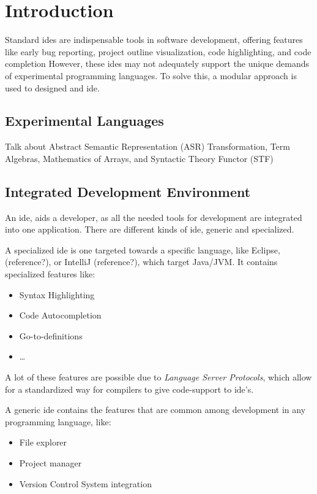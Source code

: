\chapter{Introduction}

Standard \gls{ide}s are indispensable tools in software development, offering features
like early bug reporting, project outline visualization, code highlighting, and
code completion However, these \gls{ide}s may not adequately support the unique
demands of experimental programming languages.
To solve this, a modular approach is used to designed and \gls{ide}.

\section{Experimental Languages}

Talk about Abstract Semantic Representation (ASR) Transformation,
Term Algebras, Mathematics of Arrays, and Syntactic Theory Functor (STF)

\section{Integrated Development Environment}

An \gls{ide}, aids a developer, as all the
needed tools for development are integrated into one application. There are
different kinds of \gls{ide}, generic and specialized.

A specialized \gls{ide} is one targeted towards a specific language, like Eclipse,
(reference?), or IntelliJ (reference?), which target Java/JVM. It contains
specialized features like:

\begin{itemize}
  \item Syntax Highlighting
  \item Code Autocompletion
  \item Go-to-definitions
  \item \dots
\end{itemize}

A lot of these features are possible due to \textit{Language Server Protocols},
which allow for a standardized way for compilers to give code-support to \gls{ide}'s.


A generic \gls{ide} contains the features that are common among development in any
programming language, like:

\begin{itemize}
  \item File explorer
  \item Project manager
  \item Version Control System integration
\end{itemize}
